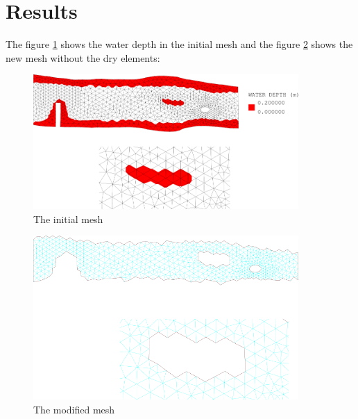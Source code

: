 \section{Results}
The figure \ref{fig:selafin:inimesh} shows the water depth in the initial mesh
and the figure \ref{fig:selafin:newmesh} shows the new mesh without the dry
elements:
\begin{figure}[H]%
\begin{center}
%
  \includegraphics[width=0.9\textwidth]{inimesh}
%
\end{center}
\caption
{The initial mesh}
\label{fig:selafin:inimesh}
\end{figure}
%
\begin{figure}[H]%
\begin{center}
%
  \includegraphics[width=0.9\textwidth]{newmesh}
%
\end{center}
\caption
{The modified mesh}
\label{fig:selafin:newmesh}
\end{figure}
%
